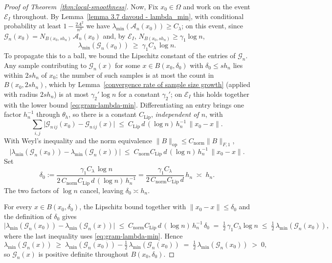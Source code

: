 \documentclass{article}
\begin{document}
\begin{proof}[Proof of Theorem~\ref{thm:local-smoothness}]
Now, Fix $x_0\in\Omega$ and work on the event $\mathscr{E}_I$ throughout. By
Lemma~\ref{lemma 3.7 davoud - lambda_min}, with conditional probability at least
$1-\tfrac{2A^2}{n^{\phi}}$ we have $\lambda_{\min}(\mathscr{A}_n(x_0))\ge C_\lambda$;
on this event, since $\mathscr{G}_n(x_0)=N_{B(x_0,sh_n)}\,\mathscr{A}_n(x_0)$ and, by
$\mathscr{E}_I$, $N_{B(x_0,sh_n)}\ge\gamma_1\log n$,
\begin{equation}
\lambda_{\min}(\mathscr{G}_n(x_0))\;\ge\;\gamma_1 C_\lambda\,\log n .
\label{eq:gram-lambda-min}
\end{equation}
To propagate this to a ball, we bound the Lipschitz constant of the entries of
$\mathscr{G}_n$. Any sample contributing to $\mathscr{G}_n(x)$ for some $x\in B(x_0,\delta_0)$
with $\delta_0\le sh_n$ lies within $2sh_n$ of $x_0$; 
the number of such samples is at most the count in $B(x_0,2sh_n)$, which by
Lemma~\ref{convergence rate of sample size growth} (applied with radius $2sh_n$) is at most
$\gamma_2'\log n$ for a constant $\gamma_2'$; on $\mathscr{E}_I$ this holds together with the
lower bound \eqref{eq:gram-lambda-min}.
Differentiating an entry brings one
factor $h_n^{-1}$ through $\theta_h$, so there is a constant $C_{\mathrm{Lip}}$,
\emph{independent of $n$}, with
$$
\sum_{i,j}\big|\mathscr{G}_{n\,ij}(x_0)-\mathscr{G}_{n\,ij}(x)\big|
\;\le\;C_{\mathrm{Lip}}\,d\,(\log n)\,h_n^{-1}\,\|x_0-x\| .
$$
With Weyl's inequality and the norm equivalence $\|B\|_{\mathrm{op}}\le C_{\mathrm{norm}}\|B\|_{F,1}$,
$$
\big|\lambda_{\min}(\mathscr{G}_n(x_0))-\lambda_{\min}(\mathscr{G}_n(x))\big|
\;\le\;C_{\mathrm{norm}}C_{\mathrm{Lip}}\,d\,(\log n)\,h_n^{-1}\,\|x_0-x\| .
$$
Set
$$
\delta_0:=\frac{\gamma_1 C_\lambda\,\log n}{2\,C_{\mathrm{norm}}C_{\mathrm{Lip}}\,d\,(\log n)\,h_n^{-1}}
=\frac{\gamma_1 C_\lambda}{2\,C_{\mathrm{norm}}C_{\mathrm{Lip}}\,d}\,h_n\;\asymp\;h_n .
$$
The two factors of $\log n$ cancel, leaving $\delta_0\asymp h_n$. 

For every $x\in B(x_0,\delta_0)$, the Lipschitz bound together with $\|x_0-x\|\le\delta_0$ and the definition of $\delta_0$ gives
\[
\big|\lambda_{\min}(\mathscr{G}_n(x_0))-\lambda_{\min}(\mathscr{G}_n(x))\big|
\;\le\; C_{\mathrm{norm}}C_{\mathrm{Lip}}\,d\,(\log n)\,h_n^{-1}\,\delta_0
\;=\;\tfrac12\,\gamma_1 C_\lambda\log n
\;\le\;\tfrac12\,\lambda_{\min}(\mathscr{G}_n(x_0)),
\]
where the last inequality uses \eqref{eq:gram-lambda-min}. Hence
\[
\lambda_{\min}(\mathscr{G}_n(x))\;\ge\;\lambda_{\min}(\mathscr{G}_n(x_0))-\tfrac12\,\lambda_{\min}(\mathscr{G}_n(x_0))
\;=\;\tfrac12\,\lambda_{\min}(\mathscr{G}_n(x_0))\;>\;0,
\]
so $\mathscr{G}_n(x)$ is positive definite throughout $B(x_0,\delta_0)$.


\end{proof}
\end{document}

